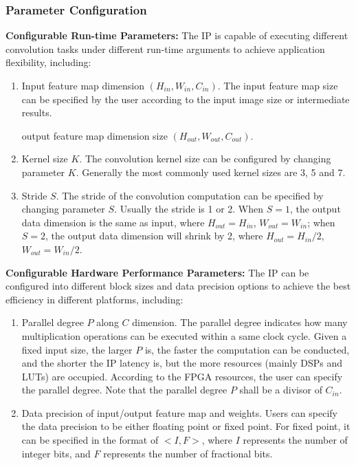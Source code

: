 \documentclass[a4paper, 11pt]{article}
\begin{document}
\subsubsection{Parameter Configuration}


\quad
\textbf{Configurable Run-time Parameters:}
The IP is capable of executing different convolution tasks under different run-time arguments to achieve application flexibility, including:

\begin{enumerate}
    \item {
    Input feature map dimension $(H_{in}, W_{in}, C_{in})$.
    The input feature map size can be specified by the user according to the input image size or intermediate results.
    
    output feature map dimension size $(H_{out}, W_{out}, C_{out})$.
    }
    
    \item {
    
    Kernel size $K$. The convolution kernel size can be configured by changing parameter $K$. Generally the most commonly used kernel sizes are 3, 5 and 7.
    }

    \item {
    Stride $S$. The stride of the convolution computation can be specified by changing parameter $S$. Usually the stride is 1 or 2.
    When $S=1$, the output data dimension is the same as input, where $H_{out} = H_{in}$, $W_{out} = W_{in}$; when $S=2$, the output data dimension will shrink by 2, where $H_{out} = H_{in} / 2$, $W_{out} = W_{in} / 2$. 
    
    }
\end{enumerate}
    
    
    \textbf{Configurable Hardware Performance Parameters:}
    The IP can be configured into different block sizes and data precision options to achieve the best efficiency in different platforms, including:
    \begin{enumerate}
       \item {
    Parallel degree $P$ along $C$ dimension. The parallel degree indicates how many multiplication operations can be executed within a same clock cycle.
    Given a fixed input size, the larger $P$ is, the faster the computation can be conducted, and the shorter the IP latency is, but the more resources (mainly DSPs and LUTs) are occupied.
    According to the FPGA resources, the user can specify the parallel degree.
    Note that the parallel degree $P$ shall be a divisor of $C_{in}$.
    }
        \item {
    Data precision of input/output feature map and weights.
    Users can specify the data precision to be either floating point
    or fixed point. For fixed point, it can be specified in the format of $<I, F>$, where $I$ represents the number of integer bits,
    and $F$ represents the number of fractional bits.
    }
\end{enumerate}
\end{document}
